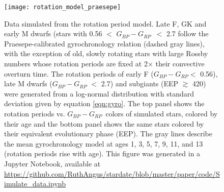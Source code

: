 \documentclass[useAMS, usenatbib, preprint, 12pt]{aastex}
\newcommand{\gcolor}{$G_{BP} - G_{RP}$}
\begin{document}
\begin{figure}
  \caption{
Data simulated from the rotation period model.
    Late F, GK and early M dwarfs (stars with 0.56 $<$ \gcolor\ $<$ 2.7 follow
    the Praesepe-calibrated gyrochronology relation (dashed gray lines), with
    the exception of old, slowly
    rotating stars with large Rossby numbers whose rotation periods are fixed
    at 2$\times$ their convective overturn time.
    The rotation periods of early F (\gcolor $<$ 0.56), late M dwarfs (\gcolor
    $<$ 2.7) and subgiants (EEP $\gtrsim$ 420) were generated
    from a log-normal distribution with standard deviation given by equation
    \ref{eqn:gyro}.
The top panel shows the rotation periods vs. \gcolor\ colors of simulated stars,
    colored by their age and the bottom panel shows the same stars colored
    by their equivalent evolutionary phase (EEP).
    The gray lines describe the mean gyrochronology model at ages 1,
    3, 5, 7, 9, 11, and 13 (rotation periods rise with age).
    This figure was generated in a Jupyter Notebook, available at
    \url{https://github.com/RuthAngus/stardate/blob/master/paper/code/Simulate_data.ipynb}
}
  \centering
    \texttt{[image: rotation\_model\_praesepe]}
\label{fig:rotation_model}
\end{figure}
\end{document}

